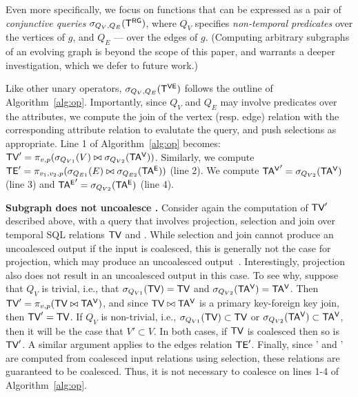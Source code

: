   Even more
specifically, we focus on functions that can be expressed as a pair of
{\em conjunctive queries} $\sigma_{Q_V,Q_E} (\mathsf{T^{RG}})$, where $Q_V$
specifies {\em non-temporal predicates} over the vertices of $g$, and
$Q_E$ --- over the edges of $g$. (Computing arbitrary subgraphs of an
evolving graph is beyond the scope of this paper, and warrants a
deeper investigation, which we defer to future work.)

Like other unary operators, $\sigma_{Q_V, Q_E} (\mathsf{T^{VE}})$ follows the
outline of Algorithm~\ref{alg:op}.  Importantly, since $Q_V$ and $Q_E$
may involve predicates over the attributes, we compute the join of the
vertex (resp. edge) relation with the corresponding attribute relation
to evalutate the query, and push selections as appropriate.  Line 1 of
Algorithm~\ref{alg:op} becomes: $\textsf{TV}' = \pi_{v,p} (\sigma_{Q_{V1}} (V)
\bowtie \sigma_{Q_{V2}} (\mathsf{TA^{V}}))$.  Similarly, we compute $\textsf{TE}' =
\pi_{v_1,v_2,p} (\sigma_{Q_{E1}} (E) \bowtie \sigma_{Q_{E2}} (\mathsf{TA^{E}}))$
(line 2).  We compute $\mathsf{TA^{V}}' = \sigma_{Q_{V2}} (\mathsf{TA^{V}})$ (line 3) and
$\mathsf{TA^{E}}' = \sigma_{Q_{V2}} (\mathsf{TA^{E}})$ (line 4).

{\bf Subgraph does not uncoalesce \tve.}  Consider again the
computation of $\textsf{TV}'$ described above, with a query that involves
projection, selection and join over temporal SQL relations $\textsf{TV}$ and
\tav.  While selection and join cannot produce an uncoalesced output
if the input is coalesced, this is generally not the case for
projection, which may produce an uncoalesced
output~\cite{DBLP:conf/vldb/BohlenSS96}.  Interestingly, projection
also does not result in an uncoalesced output in this case. To see
why, suppose that $Q_V$ is trivial, i.e., that $\sigma_{Q_{V1}} (\textsf{TV})
= \textsf{TV}$ and $\sigma_{Q_{V2}} (\mathsf{TA^{V}}) = \mathsf{TA^{V}}$. Then $\textsf{TV}' = \pi_{v,p}
(\textsf{TV} \bowtie \mathsf{TA^{V}})$, and since $\textsf{TV} \bowtie \mathsf{TA^{V}}$ is a primary
key-foreign key join, then $\textsf{TV}' = \textsf{TV}$.  If $Q_V$ is non-trivial,
i.e., $\sigma_{Q_{V1}} (\textsf{TV}) \subset \textsf{TV}$ or $\sigma_{Q_{V2}} (\mathsf{TA^{V}})
\subset \mathsf{TA^{V}}$, then it will be the case that $V' \subset V$.  In both
cases, if $\textsf{TV}$ is coalesced then so is $\textsf{TV}'$.  A similar argument
applies to the edges relation $\textsf{TE}'$.  Finally, since \tav' and \tae'
are computed from coalesced input relations using selection, these
relations are guaranteed to be coalesced.  Thus, it is not necessary
to coalesce on lines 1-4 of Algorithm~\ref{alg:op}.

